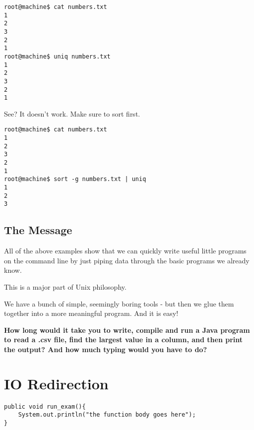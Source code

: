 \documentclass[12pt,a4paper]{article}
\begin{document}
\begin{lstlisting}[style=term]
root@machine$ cat numbers.txt
1
2
3
2
1
root@machine$ uniq numbers.txt
1
2
3
2
1
\end{lstlisting}


See? It doesn't work. Make sure to sort first.

\begin{lstlisting}[style=term]
root@machine$ cat numbers.txt
1
2
3
2
1
root@machine$ sort -g numbers.txt | uniq
1
2
3
\end{lstlisting}

\subsection{The Message}
All of the above examples show that we can quickly write useful little programs
on the command line by just piping data through the basic programs we already
know.

This is a major part of Unix philosophy.

We have a bunch of simple, seemingly boring tools - but then we glue them
together into a more meaningful program. And it is easy!

\textbf{How long would it take you to write, compile and run a Java program to
read a .csv file, find the largest value in a column, and then print the
output? And how much typing would you have to do?}

\section{ IO Redirection }




\begin{lstlisting}[style=java]
public void run_exam(){
	System.out.println("the function body goes here");
}
\end{lstlisting}
\end{document}
